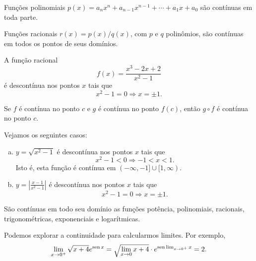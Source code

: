 \begin{corol}
  Funções polinomiais $p(x) = a_nx^n+a_{n-1}x^{n-1}+\cdots+a_1x+a_0$ são contínuas em toda parte.
\end{corol}

\begin{corol}
  Funções racionais $r(x) = p(x)/q(x)$, com $p$ e $q$ polinômios, são contínuas em todos os pontos de seus domínios.
\end{corol}

\begin{ex}
  A função racional
  \begin{equation}
    f(x) = \frac{x^3-2x+2}{x^2-1}
  \end{equation}
  é descontínua nos pontos $x$ tais que
  \begin{equation}
    x^2-1=0\Rightarrow x=\pm 1.
  \end{equation}
\end{ex}

\begin{prop}
  Se $f$ é contínua no ponto $c$ e $g$ é contínua no ponto $f(c)$, então $g\circ f$ é contínua no ponto $c$.
\end{prop}

\begin{ex}
  Vejamos os seguintes casos:
  \begin{enumerate}[a)]
  \item $y = \sqrt{x^2-1}$ é descontínua nos pontos $x$ tais que
    \begin{equation}
      x^2-1<0\Rightarrow -1<x<1.
    \end{equation}
    Isto é, esta função é contínua em $(-\infty,-1]\cup[1,\infty)$.
  \item $\displaystyle y = \left|\frac{x-1}{x^2-1}\right|$ é descontínua nos pontos $x$ tais que
    \begin{equation}
      x^2-1=0\Rightarrow x=\pm 1.
    \end{equation}
  \end{enumerate}
\end{ex}

\begin{obs}
  São contínuas em todo seu domínio as funções potência, polinomiais, racionais, trigonométricas, exponenciais e logarítmicas.
\end{obs}

\begin{ex}
  Podemos explorar a continuidade para calcularmos limites. Por exemplo,
  \begin{equation}
    \lim_{x\to 0^+} \sqrt{x+4}e^{\operatorname{sen} x} = \sqrt{\lim_{x\to 0}x+4}\cdot e^{\operatorname{sen} \lim_{x\to 0^+} x} = 2.
  \end{equation}
\end{ex}

